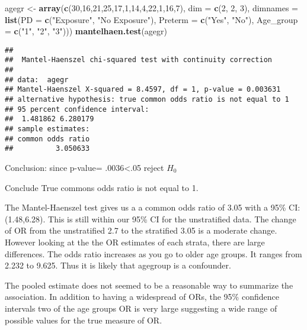 \documentclass[]{article}
\newenvironment{Shaded}{\begin{snugshade}}{\end{snugshade}}
\newcommand{\KeywordTok}[1]{\textcolor[rgb]{0.13,0.29,0.53}{\textbf{#1}}}
\newcommand{\DataTypeTok}[1]{\textcolor[rgb]{0.13,0.29,0.53}{#1}}
\newcommand{\DecValTok}[1]{\textcolor[rgb]{0.00,0.00,0.81}{#1}}
\newcommand{\StringTok}[1]{\textcolor[rgb]{0.31,0.60,0.02}{#1}}
\newcommand{\NormalTok}[1]{#1}
\begin{document}
\begin{Shaded}
\begin{Highlighting}[]
\NormalTok{agegr <-}\StringTok{ }\KeywordTok{array}\NormalTok{(}\KeywordTok{c}\NormalTok{(}\DecValTok{30}\NormalTok{,}\DecValTok{16}\NormalTok{,}\DecValTok{21}\NormalTok{,}\DecValTok{25}\NormalTok{,}\DecValTok{17}\NormalTok{,}\DecValTok{1}\NormalTok{,}\DecValTok{14}\NormalTok{,}\DecValTok{4}\NormalTok{,}\DecValTok{22}\NormalTok{,}\DecValTok{1}\NormalTok{,}\DecValTok{16}\NormalTok{,}\DecValTok{7}\NormalTok{),}
\DataTypeTok{dim =} \KeywordTok{c}\NormalTok{(}\DecValTok{2}\NormalTok{, }\DecValTok{2}\NormalTok{, }\DecValTok{3}\NormalTok{),}
\DataTypeTok{dimnames =} \KeywordTok{list}\NormalTok{(}\DataTypeTok{PD =} \KeywordTok{c}\NormalTok{(}\StringTok{"Exposure"}\NormalTok{, }\StringTok{"No Exposure"}\NormalTok{),}
\DataTypeTok{Preterm =} \KeywordTok{c}\NormalTok{(}\StringTok{"Yes"}\NormalTok{, }\StringTok{"No"}\NormalTok{),}
\DataTypeTok{Age_group =} \KeywordTok{c}\NormalTok{(}\StringTok{"1"}\NormalTok{, }\StringTok{"2"}\NormalTok{, }\StringTok{"3"}\NormalTok{)))}
\KeywordTok{mantelhaen.test}\NormalTok{(agegr)}
\end{Highlighting}
\end{Shaded}

\begin{verbatim}
## 
##  Mantel-Haenszel chi-squared test with continuity correction
## 
## data:  agegr
## Mantel-Haenszel X-squared = 8.4597, df = 1, p-value = 0.003631
## alternative hypothesis: true common odds ratio is not equal to 1
## 95 percent confidence interval:
##  1.481862 6.280179
## sample estimates:
## common odds ratio 
##          3.050633
\end{verbatim}

Conclusion: since p-value= .0036\textless{}.05 reject \(H_0\)

Conclude True commons odds ratio is not equal to 1.

The Mantel-Haenszel test gives us a a common odds ratio of 3.05 with a
95\% CI: (1.48,6.28). This is still within our 95\% CI for the
unstratified data. The change of OR from the unstratified 2.7 to the
stratified 3.05 is a moderate change. However looking at the the OR
estimates of each strata, there are large differences. The odds ratio
increases as you go to older age groups. It ranges from 2.232 to 9.625.
Thus it is likely that agegroup is a confounder.

The pooled estimate does not seemed to be a reasonable way to summarize
the association. In addition to having a widespread of ORs, the 95\%
confidence intervals two of the age groups OR is very large suggesting a
wide range of possible values for the true measure of OR.
\end{document}
